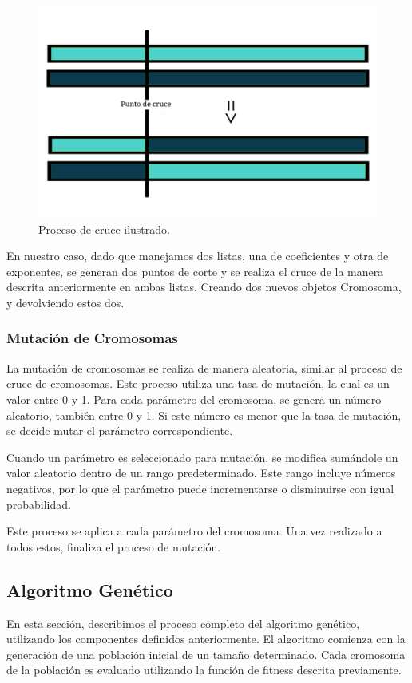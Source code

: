 \documentclass[conference,a4paper]{IEEEtran}
\begin{document}
\begin{figure}[h]
    \centering
    \includegraphics[width=\columnwidth]{image-chromosome-crossover.jpg}
    \caption{Proceso de cruce ilustrado.}
    \label{fig:chromosome-crossover}
\end{figure}


En nuestro caso, dado que manejamos dos listas, una de coeficientes y otra de exponentes, se generan dos puntos de corte y se realiza el cruce de la manera descrita anteriormente en ambas listas. Creando dos nuevos objetos Cromosoma, y devolviendo estos dos.



\subsubsection{Mutación de Cromosomas}
La mutación de cromosomas se realiza de manera aleatoria, similar al proceso de cruce de cromosomas. Este proceso utiliza una tasa de mutación, la cual es un valor entre 0 y 1. Para cada parámetro del cromosoma, se genera un número aleatorio, también entre 0 y 1. Si este número es menor que la tasa de mutación, se decide mutar el parámetro correspondiente.

Cuando un parámetro es seleccionado para mutación, se modifica sumándole un valor aleatorio dentro de un rango predeterminado. Este rango incluye números negativos, por lo que el parámetro puede incrementarse o disminuirse con igual probabilidad. 

Este proceso se aplica a cada parámetro del cromosoma. Una vez realizado a todos estos, finaliza el proceso de mutación.


\subsection{Algoritmo Genético}
En esta sección, describimos el proceso completo del algoritmo genético, utilizando los componentes definidos anteriormente. El algoritmo comienza con la generación de una población inicial de un tamaño determinado. Cada cromosoma de la población es evaluado utilizando la función de fitness descrita previamente.
\end{document}
